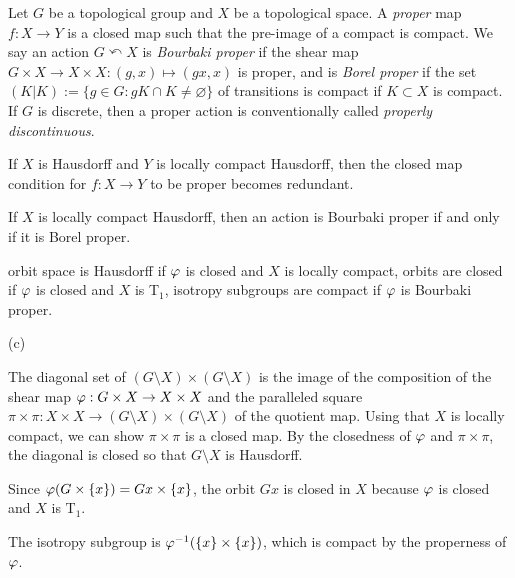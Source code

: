 \documentclass{../../large}
\begin{document}
\begin{prb}
Let $G$ be a topological group and $X$ be a topological space.
A \emph{proper} map $f:X\to Y$ is a closed map such that the pre-image of a compact is compact.
We say an action $G\curvearrowleft X$ is \emph{Bourbaki proper} if the shear map $G\times X\to X\times X:(g,x)\mapsto(gx,x)$ is proper, and is \emph{Borel proper} if the set $(K|K):=\{g\in G:gK\cap K\ne\varnothing\}$ of transitions is compact if $K\subset X$ is compact.
If $G$ is discrete, then a proper action is conventionally called \emph{properly discontinuous}.
\begin{parts}
\item If $X$ is Hausdorff and $Y$ is locally compact Hausdorff, then the closed map condition for $f:X\to Y$ to be proper becomes redundant.
\item If $X$ is locally compact Hausdorff, then an action is Bourbaki proper if and only if it is Borel proper.
\item orbit space is Hausdorff if $\varphi$ is closed and $X$ is locally compact, orbits are closed if $\varphi$ is closed and $X$ is T$_1$, isotropy subgroups are compact if $\varphi$ is Bourbaki proper.
\end{parts}
\end{prb}
\begin{pf}
(c)

The diagonal set of $(G\setminus X)\times(G\setminus X)$ is the image of the composition of the shear map $\varphi:G\times X\to X\times X$ and the paralleled square $\pi\times\pi:X\times X\to(G\setminus X)\times(G\setminus X)$ of the quotient map.
Using that $X$ is locally compact, we can show $\pi\times\pi$ is a closed map.
By the closedness of $\varphi$ and $\pi\times\pi$, the diagonal is closed so that $G\setminus X$ is Hausdorff.

Since $\varphi(G\times\{x\})=Gx\times\{x\}$, the orbit $Gx$ is closed in $X$ because $\varphi$ is closed and $X$ is T$_1$.

The isotropy subgroup is $\varphi^{-1}(\{x\}\times\{x\})$, which is compact by the properness of $\varphi$.
\end{pf}



\chapter{}
\end{document}
